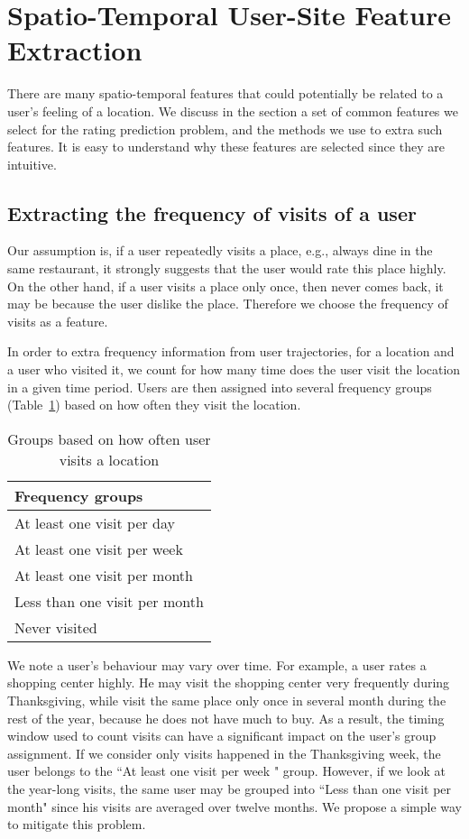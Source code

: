 \section{Spatio-Temporal User-Site Feature Extraction}
\label{sec:method}

There are many spatio-temporal features that could potentially be related to a user's feeling of a location. We discuss in the section a set of common features we select for the rating prediction problem, and the methods we use to extra such features. It is easy to understand why these features are selected since they are intuitive.

\subsection{Extracting the frequency of visits of a user}

Our assumption is, if a user repeatedly visits a place, e.g., always dine in the same restaurant, it strongly suggests that the user would rate this place highly. On the other hand, if a user visits a place only once, then never comes back, it may be because the user dislike the place. Therefore we choose the frequency of visits as a feature.

In order to extra frequency information from user trajectories, for a location and a user who visited it, we count for how many time does the user visit the location in a given time period. Users are then assigned into several frequency groups (Table~\ref{frequencyGroups}) based on how often they visit the location.

\begin{table}[htbp]
\begin{center}
\caption{Groups based on how often user visits a location \label{frequencyGroups}}
\begin{tabular}{|l|} \hline
\textbf{Frequency groups} \\ \hline
At least one visit per day \\ \hline
At least one visit per week \\ \hline
At least one visit per month \\ \hline
Less than one visit per month \\ \hline
Never visited \\ \hline
\end{tabular}
\end{center}
\end{table}

We note a user's behaviour may vary over time. For example, a user rates a shopping center highly. He may visit the shopping center very frequently during Thanksgiving, while visit the same place only once in several month during the rest of the year, because he does not have much to buy. As a result, the timing window used to count visits can have a significant impact on the user's group assignment. If we consider only visits happened in the Thanksgiving week, the user belongs to the ``At least one visit per week " group. However, if we look at the year-long visits, the same user may be grouped into ``Less than one visit per month" since his visits are averaged over twelve months. We propose a simple way to mitigate this problem.

